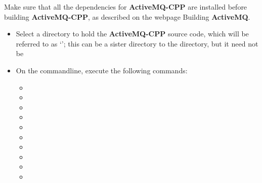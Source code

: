 Make sure that all the dependencies for \textbf{ActiveMQ-CPP} are installed before
building \textbf{ActiveMQ-CPP}, as described on the web\longDash{}page
%
{Building \textbf{ActiveMQ}}.
\begin{itemize}
\item Select a directory to hold the \textbf{ActiveMQ-CPP} source code, which will be
referred to as `'; this can be a sister directory to the
 directory, but it need not be
\item\exSp{}On the command\longDash{}line, execute the following commands:
\begin{itemize}
\item {}
\item\exSp{}
\item\exSp{}
\item\exSp{}
\item\exSp{}
\item\exSp{}
\item\exSp{}
\item\exSp{}
\item\exSp{}
\item\exSp{}
\end{itemize}
\end{itemize}
\tertiaryEnd
{}
